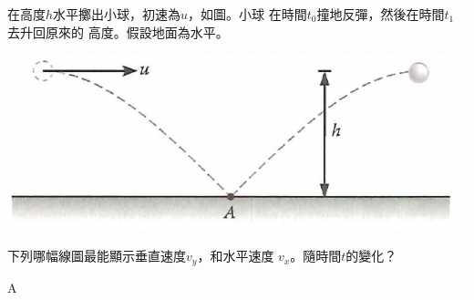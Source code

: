 {
    在高度$h$水平擲出小球，初速為$u$，如圖。小球 在時間$t_0$撞地反彈，然後在時間$t_1$去升回原來的 高度。假設地面為水平。\medskip
    {\par\centering
        \includegraphics[width=0.5\linewidth]{assets/dqwdqd.png}\par}
    \medskip\par 下列哪幅線圖最能顯示垂直速度$v_y$，和水平速度 $v_x$。隨時間$t$的變化？
    \begin{tasks}
        \task


        \task


        \task


        \task
    \end{tasks}
}{A}

